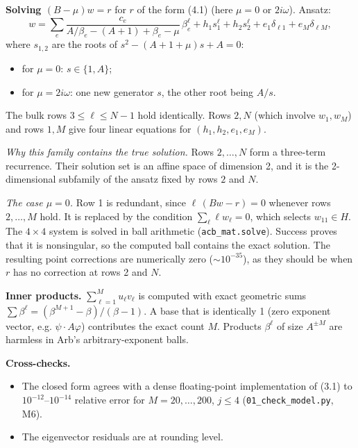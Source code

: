 \documentclass[11pt,a4paper]{report}
\begin{document}
\textbf{Solving \((B-\mu)w=r\)} for \(r\) of the form (4.1) (here \(\mu=0\) or \(2i\omega\)). Ansatz:
\[w=\sum_e \frac{c_e}{A/\beta_e-(A+1)+\beta_e-\mu}\,\beta_e^\ell+h_1s_1^\ell+h_2s_2^\ell+e_1\delta_{\ell1}+e_M\delta_{\ell M},\]
where \(s_{1,2}\) are the roots of \(s^2-(A+1+\mu)s+A=0\):
\begin{itemize}
\tightlist
\item for \(\mu=0\): \(s\in\{1,A\}\);
\item for \(\mu=2i\omega\): one new generator \(s\), the other root being \(A/s\).
\end{itemize}

The bulk rows \(3\le\ell\le N-1\) hold identically. Rows \(2,N\) (which involve \(w_1,w_M\)) and rows \(1,M\) give
four linear equations for \((h_1,h_2,e_1,e_M)\).

\emph{Why this family contains the true solution.} Rows \(2,\dots,N\) form a three-term recurrence. Their solution set
is an affine space of dimension 2, and it is the 2-dimensional subfamily of the ansatz fixed by rows \(2\) and
\(N\).

\emph{The case \(\mu=0\).} Row 1 is redundant, since \(\boldsymbol\ell\,(Bw-r)=0\) whenever rows \(2,\dots,M\) hold. It
is replaced by the condition \(\sum_\ell \ell w_\ell=0\), which selects \(w_{11}\in H\). The \(4\times4\) system is
solved in ball arithmetic (\texttt{acb\_mat.solve}). Success proves that it is nonsingular, so the computed ball contains
the exact solution. The resulting point corrections are numerically zero (\(\sim10^{-35}\)), as they should be when
\(r\) has no correction at rows 2 and \(N\).

\textbf{Inner products.} \(\sum_{\ell=1}^M u_\ell v_\ell\) is computed with exact geometric sums
\(\sum\beta^\ell=(\beta^{M+1}-\beta)/(\beta-1)\). A base that is identically 1 (zero exponent vector, e.g.
\(\psi\cdot A\varphi\)) contributes the exact count \(M\). Products \(\beta^\ell\) of size \(A^{\pm M}\) are harmless
in Arb's arbitrary-exponent balls.

\textbf{Cross-checks.}
\begin{itemize}
\tightlist
\item The closed form agrees with a dense floating-point implementation of (3.1) to \(10^{-12}\)--\(10^{-14}\) relative
error for \(M=20,\dots,200\), \(j\le4\) (\texttt{01\_check\_model.py}, M6).
\item The eigenvector residuals are at rounding level.
\end{itemize}
\end{document}
